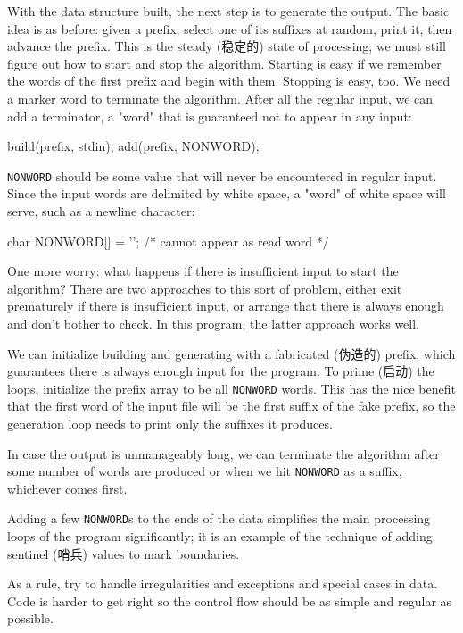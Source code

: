 With the data structure built, the next step is to generate the output. The
basic idea is as before: given a prefix, select one of its suffixes at
random, print it, then advance the prefix. This is the steady (稳定的)
state of processing; we must still figure out how to start and stop the
algorithm. Starting is easy if we remember the words of the first prefix
and begin with them. Stopping is easy, too. We need a marker word to
terminate the algorithm. After all the regular input, we can add a
terminator, a "word" that is guaranteed not to appear in any input:
\begin{wellcode}
    build(prefix, stdin);
    add(prefix, NONWORD);
\end{wellcode}
\verb'NONWORD' should be some value that will never be encountered in
regular input. Since the input words are delimited by white space, a "word"
of white space will serve, such as a newline character:
\begin{wellcode}
    char    NONWORD[] = '\n';   /* cannot appear as read word */
\end{wellcode}

One more worry: what happens if there is insufficient input to start the
algorithm?  There are two approaches to this sort of problem, either exit
prematurely if there is insufficient input, or arrange that there is always
enough and don't bother to check.  In this program, the latter approach
works well.

We can initialize building and generating with a fabricated (伪造的)
prefix, which guarantees there is always enough input for the program. To
prime (启动) the loops, initialize the prefix array to be all
\verb'NONWORD' words. This has the nice benefit that the first word of the
input file will be the first suffix of the fake prefix, so the generation
loop needs to print only the suffixes it produces.

In case the output is unmanageably long, we can terminate the algorithm
after some number of words are produced or when we hit \verb'NONWORD' as a
suffix, whichever comes first.

Adding a few \verb'NONWORD's to the ends of the data simplifies the main
processing loops of the program significantly; it is an example of the
technique of adding sentinel (哨兵) values to mark boundaries.

As a rule, try to handle irregularities and exceptions and special cases in
data.
Code is harder to get right so the control flow should be as simple and
regular as possible.

